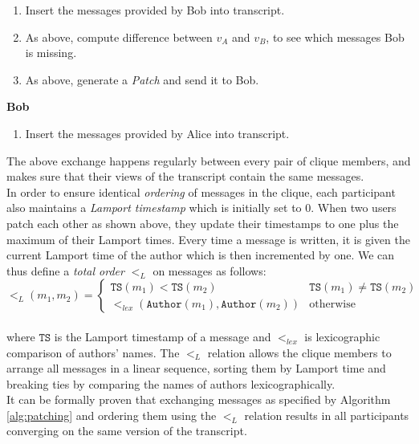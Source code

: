 \documentclass[a4paper, twoside, 12pt]{report}
\begin{document}
\begin{algorithm}
\begin{enumerate}[topsep=2pt, itemsep=2pt]
    \item Insert the messages provided by Bob into transcript.
    \item As above, compute difference between $v_A$ and $v_B$, to see which messages Bob is missing.
    \item As above, generate a \textit{Patch} and send it to Bob. \\
\end{enumerate}
\vspace{-2pt}
{\bfseries Bob}
\begin{enumerate}[topsep=2pt, itemsep=2pt]
    \item Insert the messages provided by Alice into transcript.
\end{enumerate}
\vspace{2pt}
\end{algorithm}

The above exchange happens regularly between every pair of clique members, and makes sure that their views of the transcript contain the same messages. \\

In order to ensure identical \emph{ordering} of messages in the clique, each participant also maintains a \emph{Lamport timestamp} which is initially set to 0. When two users patch each other as shown above, they update their timestamps to one plus the maximum of their Lamport times. Every time a message is written, it is given the current Lamport time of the author which is then incremented by one. We can thus define a \emph{total order} $<_L$ on messages as follows:\\

\[
    <_L(m_1, m_2) = 
        \begin{cases}
            \mathtt{TS}(m_1) < \mathtt{TS}(m_2) & \mathtt{TS}(m_1) \neq \mathtt{TS}(m_2) \\
            <_{lex}(\mathtt{Author}(m_1), \mathtt{Author}(m_2)) & \text{otherwise}
        \end{cases}
\] \\

where $\mathtt{TS}$ is the Lamport timestamp of a message and $<_{lex}$ is lexicographic comparison of authors' names. The $<_L$ relation allows the clique members to arrange all messages in a linear sequence, sorting them by Lamport time and breaking ties by comparing the names of authors lexicographically. \\ 

It can be formally proven \cite{reardon2007kleeq} that exchanging messages as specified by Algorithm \ref{alg:patching} and ordering them using the $<_L$ relation results in all participants converging on the same version of the transcript.
\end{document}
